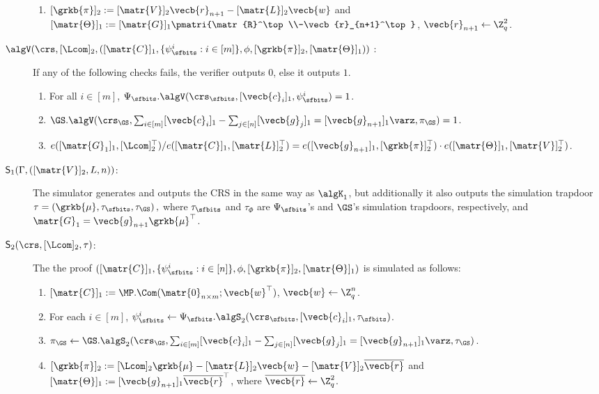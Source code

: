 \begin{description}
\begin{enumerate}
\item $[\grkb{\pi}]_2:=[\matr{V}]_2\vecb{r}_{n+1}-[\matr{L}]_2\vecb{w}$ and $[\matr{\Theta}]_1 := [\matr{G}]_1\pmatri{\matr{R}^\top\\-\vecb{r}_{n+1}^\top}$, $\vecb{r}_{n+1}\gets\Z_q^2$.
\end{enumerate}
\item[
{{$\algV(
    \crs,
    [\Lcom]_2,
    (
    [\matr{C}]_1,
    \{\psi_\sfbits^i:i\in[m]\},
    \phi,
    [\grkb{\pi}]_2,[\matr{\Theta}]_1
    ))$
}}:]
If any of the following checks fails, the verifier outputs $0$, else it outputs $1$.
\begin{enumerate}
\item For all $i\in[m]$, $\Psi_\sfbits.\algV(\crs_\sfbits, [\vecb{c}_i]_1,\psi_\sfbits^i)=1$. 
\item $\GS.\algV(\crs_\GS, \sum_{i\in[m]}[\vecb{c}_i]_1-\sum_{j\in[n]}[\vecb{g}_j]_1=[\vecb{g}_{n+1}]_1\varz, \pi_\GS)=1$.
\item $e([\matr{G}_1]_1,[\Lcom]_2^\top)/e([\matr{C}]_1,[\matr{L}]_2^\top) = e([\vecb{g}_{n+1}]_1,[\grkb{\pi}]_2^\top)\cdot e([\matr{\Theta}]_1,[\matr{V}]_2^\top)$.
\end{enumerate}

\item[{$\mathsf{S}_1(\Gamma,([\matr{V}]_2,L,n))$}:] 
The simulator generates and outputs the CRS in the same way as $\algK_1$, but additionally it also  outputs the simulation trapdoor $\tau=\left(\grkb{\mu}, \tau_\sfbits, \tau_\GS\right),$
where $\tau_\sfbits$ and $\tau_\Phi$ are $\Psi_\sfbits$'s and $\GS$'s simulation trapdoors, respectively, and
$\matr{G}_1=\vecb{g}_{n+1}\grkb{\mu}^\top$.
\item[{$\mathsf{S}_2(\crs,[\Lcom]_2,\tau)$}:] The the proof $([\matr{C}]_1,\{\psi_\sfbits^i:i\in[n]\},\phi,[\grkb{\pi}]_2,[\matr{\Theta}]_1)$ is simulated as follows:
\begin{enumerate}
\item $[\matr{C}]_1:=\MP.\Com(\matr{0}_{n\times m};\vecb{w}^\top)$, $\vecb{w}\gets \Z_q^n$.
\item For each $i\in[m]$, $\psi^i_\sfbits\gets\Psi_\sfbits.\algS_2(\crs_\sfbits,[\vecb{c}_i]_1,\tau_\sfbits)$.
\item $\pi_\GS\gets\GS.\algS_2(\crs_\GS,\sum_{i\in[m]}[\vecb{c}_i]_1-\sum_{j\in[n]}[\vecb{g}_j]_1=[\vecb{g}_{n+1}]_1\varz,\tau_\GS)$.
\item $[\grkb{\pi}]_2:=[\Lcom]_2\grkb{\mu}-[\matr{L}]_2\vecb{w}-[\matr{V}]_2\overline{\vecb{r}}$ and $[\matr{\Theta}]_1:=[\vecb{g}_{n+1}]_1\overline{\vecb{r}}^\top$, where $\overline{\vecb{r}}\gets\Z_q^2$.

\end{enumerate}
\end{description}


